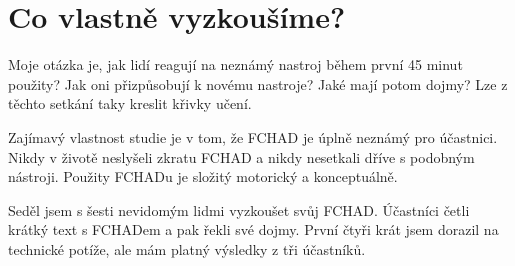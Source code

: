 \section{Co vlastně vyzkoušíme?}

Moje otázka je, jak lidí reagují na neznámý nastroj během první 45 minut použity?  Jak oni přizpůsobují k novému nastroje?  Jaké mají potom dojmy?  Lze z těchto setkání taky kreslit křivky učení.

Zajímavý vlastnost studie je v tom, že FCHAD je úplně neznámý pro účastnici.  Nikdy v životě neslyšeli zkratu FCHAD a nikdy nesetkali dříve s podobným nástroji.  Použity FCHADu je složitý motorický a konceptuálně.

Seděl jsem s šesti nevidomým lidmi vyzkoušet svůj FCHAD. Účastníci četli krátký text s FCHADem a pak řekli své dojmy.  První čtyři krát jsem dorazil na technické potíže, ale mám platný výsledky z tři účastníků.
